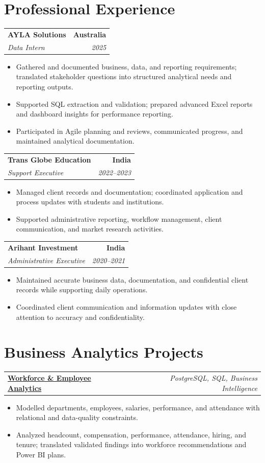 \documentclass[letterpaper,10pt]{article}
\makeatletter
\newcommand{\role}[4]{%
  \begin{tabularx}{\textwidth}{@{}Xr@{}}
    \textbf{#1} & \textbf{#2} \\
    \textit{#3} & \textit{#4}
  \end{tabularx}\vspace{-1pt}
}
\newcommand{\project}[2]{%
  \begin{tabularx}{\textwidth}{@{}Xr@{}}
    \textbf{#1} & \textit{#2}
  \end{tabularx}\vspace{-1pt}
}
\makeatother
\begin{document}
\section{Professional Experience}
\role{AYLA Solutions}{Australia}{Data Intern}{2025}
\begin{itemize}
  \item Gathered and documented business, data, and reporting requirements; translated stakeholder questions into structured analytical needs and reporting outputs.
  \item Supported SQL extraction and validation; prepared advanced Excel reports and dashboard insights for performance reporting.
  \item Participated in Agile planning and reviews, communicated progress, and maintained analytical documentation.
\end{itemize}
\vspace{1pt}

\role{Trans Globe Education}{India}{Support Executive}{2022--2023}
\begin{itemize}
  \item Managed client records and documentation; coordinated application and process updates with students and institutions.
  \item Supported administrative reporting, workflow management, client communication, and market research activities.
\end{itemize}
\vspace{1pt}

\role{Arihant Investment}{India}{Administrative Executive}{2020--2021}
\begin{itemize}
  \item Maintained accurate business data, documentation, and confidential client records while supporting daily operations.
  \item Coordinated client communication and information updates with close attention to accuracy and confidentiality.
\end{itemize}

\section{Business Analytics Projects}
\project{\href{https://github.com/jainalimehta/HR-Analytics}{Workforce \& Employee Analytics}}{PostgreSQL, SQL, Business Intelligence}
\begin{itemize}
  \item Modelled departments, employees, salaries, performance, and attendance with relational and data-quality constraints.
  \item Analyzed headcount, compensation, performance, attendance, hiring, and tenure; translated validated findings into workforce recommendations and Power BI plans.
\end{itemize}
\vspace{1pt}
\end{document}
